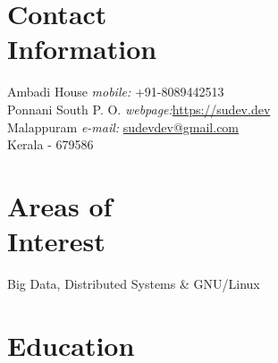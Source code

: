 \documentclass[margin,line]{resume}
\begin{document}
\begin{resume}

    \section{\mysidestyle Contact\\Information}
    
        
    Ambadi House   \hfill \textit{mobile:} \hspace{9mm} 		+91-8089442513 \\ 
    Ponnani South P. O.	\hfill \textit{webpage:}\hspace{20mm}\href{http://sudev.dev}{https://sudev.dev}\\
    Malappuram \hfill 	\textit{e-mail:} \hspace{3.6mm}\href{mailto:sudevdev@gmail.com}{sudevdev@gmail.com}     \\
    Kerala - 679586
			
        \vspace{-2.5mm}
        
        \vspace{3mm}
%
					
    \section{\mysidestyle Areas of\\Interest}

   Big Data, Distributed Systems \& GNU/Linux
\vspace{3mm}


    \section{\mysidestyle Education}


\end{resume}
\end{document}
